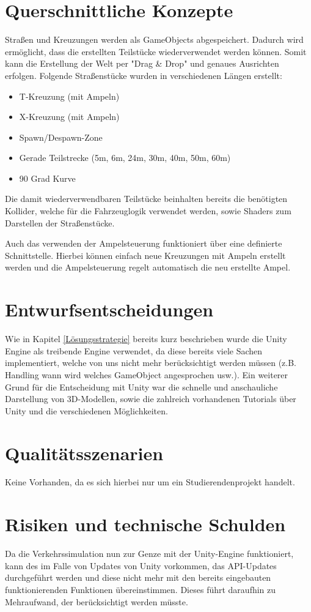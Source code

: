 \section{Querschnittliche Konzepte}
\label{Querschnittliche Konzepte}

Straßen und Kreuzungen werden als GameObjects abgespeichert. Dadurch wird ermöglicht, dass die erstellten Teilstücke wiederverwendet werden können. Somit kann die Erstellung der Welt per "Drag \& Drop" und genaues Ausrichten erfolgen. Folgende Straßenstücke wurden in verschiedenen Längen erstellt:

\begin{itemize}  
\item T-Kreuzung (mit Ampeln)
\item X-Kreuzung (mit Ampeln)
\item Spawn/Despawn-Zone
\item Gerade Teilstrecke (5m, 6m, 24m, 30m, 40m, 50m, 60m)
\item 90 Grad Kurve
\end{itemize}

Die damit wiederverwendbaren Teilstücke beinhalten bereits die benötigten Kollider, welche für die Fahrzeuglogik verwendet werden, sowie Shaders zum Darstellen der Straßenstücke.

Auch das verwenden der Ampelsteuerung funktioniert über eine definierte Schnittstelle. Hierbei können einfach neue Kreuzungen mit Ampeln erstellt werden und die Ampelsteuerung regelt automatisch die neu erstellte Ampel.

\section{Entwurfsentscheidungen}
\label{Entwurfsentscheidungen}

Wie in Kapitel \ref{Lösungsstrategie} bereits kurz beschrieben wurde die Unity Engine als treibende Engine verwendet, da diese bereits viele Sachen implementiert, welche von uns nicht mehr berücksichtigt werden müssen (z.B. Handling wann wird welches GameObject angesprochen usw.). Ein weiterer Grund für die Entscheidung mit Unity war die schnelle und anschauliche Darstellung von 3D-Modellen, sowie die zahlreich vorhandenen Tutorials über Unity und die verschiedenen Möglichkeiten.

\section{Qualitätsszenarien}
\label{Qualitätsszenarien}

Keine Vorhanden, da es sich hierbei nur um ein Studierendenprojekt handelt.

\section{Risiken und technische Schulden}
\label{Risiken und technische Schulden}

Da die Verkehrssimulation nun zur Genze mit der Unity-Engine funktioniert, kann des im Falle von Updates von Unity vorkommen, das API-Updates durchgeführt werden und diese nicht mehr mit den bereits eingebauten funktionierenden Funktionen übereinstimmen. Dieses führt daraufhin zu Mehraufwand, der berücksichtigt werden müsste.